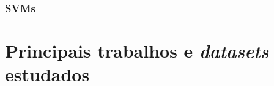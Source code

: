 


 
\subsection{SVMs}
\label{subsection:SVMs}

\chapter{Principais trabalhos e \emph{datasets} estudados}

